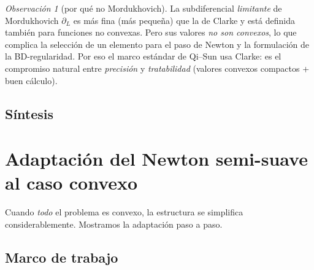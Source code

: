 \documentclass[12pt]{book}
\newcommand{\subdiffL}{\partial_L}
\theoremstyle{definition}
\theoremstyle{plain}
\theoremstyle{remark}
\newtheorem{observacion}{Observación}[section]
\begin{document}
\bigskip

\begin{observacion}[por qué no Mordukhovich]
  La subdiferencial \emph{limitante} de Mordukhovich $\subdiffL$ es
  más fina (más pequeña) que la de Clarke y está definida también
  para funciones no convexas.  Pero sus valores \emph{no son
  convexos}, lo que complica la selección de un elemento para el
  paso de Newton y la formulación de la BD-regularidad.  Por eso el
  marco estándar de Qi--Sun usa Clarke: es el compromiso natural
  entre \emph{precisión} y \emph{tratabilidad} (valores convexos
  compactos + buen cálculo).
\end{observacion}

\subsection{Síntesis}

\begin{center}
\end{center}

\section{Adaptación del Newton semi-suave al caso convexo}

Cuando \emph{todo} el problema es convexo, la estructura se simplifica
considerablemente.  Mostramos la adaptación paso a paso.

\subsection{Marco de trabajo}
\end{document}
